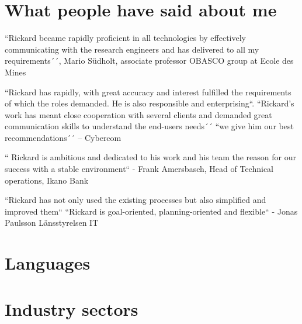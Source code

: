 \documentclass[11pt,a4paper,sans]{moderncv}
\begin{document}
\section{What people have said about me}
\large 

\begin{quotelist}
    \item
    ``Rickard became rapidly proficient in all technologies by effectively communicating with the research engineers and has delivered to all my requirements´´,
      Mario Südholt, associate professor OBASCO group at Ecole des Mines 
\item
        ``Rickard has rapidly, with great accuracy and interest fulfilled the requirements of which the roles demanded.  He is also responsible and enterprising``. ``Rickard’s work has meant close cooperation with several clients and demanded great communication skills to understand the end-users needs´´ 
        ``we give him our best recommendations´´ – Cybercom 
\item     
        `` Rickard is ambitious and dedicated to his work and his team the reason for our success with a stable environment``  - Frank Amersbasch, Head of Technical operations, Ikano Bank 
\item  ``Rickard has not only used the existing processes but also simplified and improved them`` ``Rickard is goal-oriented, planning-oriented and flexible``  - Jonas Paulsson Länsstyrelsen IT 
       
  \end{quotelist}

\section{Languages}

\section{Industry sectors}

\
\end{document}
